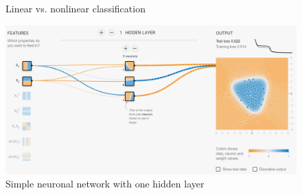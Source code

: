 \documentclass[10pt]{article}
\newcommand{\includetex}[1]{
    \def\svgwidth{\columnwidth}
    {#1.pdf_tex}
}
\newif\ifen
\newif\ifde
\newcommand{\en}[1]{\ifen#1\fi}
\newcommand{\de}[1]{\ifde#1\fi}
\begin{document}
				\begin{figure}[H]
					\begin{center}
						\scalebox{1.0}{\includetex{classification}}
					\end{center}
					\caption{Linear vs. nonlinear classification}
					\label{fig:overview_linear_nonlinear_classification}
				\end{figure}
	
				\de{Für das zweite Problem können wir die Funktion noch anpassen. Für das dritte nichtlineare Problem ist der Klassifikationsraum nicht mehr ausreichend und erfordert einen anderen Algorithmus. Und hier kommen die neuronalen Netze ins Spiel. Ein Tool, um das Trennen von Daten zu visualisieren und die Funktionsweise der einzelnen Layer zu testen ist \url{https://playground.tensorflow.org}\footnote{Neural Network Right Here in Your Browser: \url{https://playground.tensorflow.org}}. Ein nichtlineares Problem kann im einfachsten Fall schon mit einer hinzugefügten versteckten Schicht mit drei weiteren Neuronen gelöst werden:}
				\en{For the second problem we can still adjust the function. For the third nonlinear problem the classification space is no longer sufficient and requires a different algorithm. And this is where the neural networks come into play. A tool to visualize the separation of data and to test the functionality of the individual layers is \url{https://playground.tensorflow.org}\footnote{Neural Network Right Here in Your Browser: \url{https://playground.tensorflow.org}}. In the simplest case, a nonlinear problem can be solved by adding a hidden layer with three additional neurons:}

				\begin{figure}[H]
					\centering
					\includegraphics[width=1.0\textwidth]{images/simple_neuronal_network}
					\caption[Simple neuronal network with one hidden layer]{Simple neuronal network with one hidden layer\footnotemark}
					\label{fig:beispiel4}
				\end{figure}
		
\end{document}
